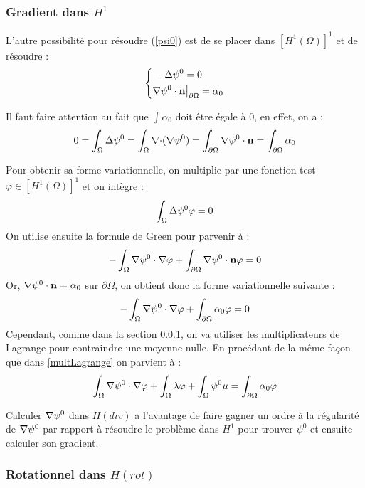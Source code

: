 \subsubsection{Gradient dans $H^1$}
\label{secpsi0hdiv}

L'autre possibilité pour résoudre (\ref{psi0}) est de se placer dans $[H^1(\Omega)]^1$ et de résoudre :
\begin{equation}
\label{pbpsi0}
\left\{
\begin{aligned}
&-{\Delta}\psi^0 = 0\\
&{\nabla}\psi^0\cdot \mathbf{n}{\big\rvert_{\partial\Omega}}=\alpha_0
\end{aligned}
\right.
\end{equation}

Il faut faire attention au fait que $\int \alpha_0$ doit être égale à 0, en effet, on a :
\[
0=\int_\Omega {\Delta} \psi^0 = \int_\Omega {\nabla\cdot}({\nabla}\psi^0) = \int_{\partial\Omega} {\nabla}\psi^0\cdot \mathbf{n} = \int_{\partial\Omega} \alpha_0
\]

Pour obtenir sa forme variationnelle, on multiplie par une fonction test $\varphi\in [H^1(\Omega)]^1$ et on intègre :
\[
\int_\Omega {\Delta}\psi^0 \varphi = 0
\]
On utilise ensuite la formule de Green pour parvenir à :
\[
-\int_\Omega {\nabla}\psi^0\cdot{\nabla}\varphi + \int_{\partial\Omega} {\nabla}\psi^0\cdot \mathbf{n}\varphi = 0
\]
Or, ${\nabla}\psi^0\cdot \mathbf{n} = \alpha_0$ sur $\partial\Omega$, on obtient donc la forme variationnelle suivante :
\[
-\int_\Omega {\nabla}\psi^0\cdot{\nabla}\varphi + \int_{\partial\Omega} \alpha_0\varphi = 0
\]
Cependant, comme dans la section \ref{secpsi0hdiv}, on va utiliser les multiplicateurs de Lagrange pour contraindre une moyenne nulle. En procédant de la même façon que dans \ref{multLagrange} on parvient à :
\begin{equation}
\label{fvpsi0}
\int_\Omega {\nabla}\psi^0\cdot{\nabla}\varphi + \int_\Omega \lambda\varphi + \int_\Omega \psi^0\mu = \int_{\partial\Omega} \alpha_0\varphi
\end{equation}

Calculer ${\nabla}\psi^0$ dans $H(div)$ a l'avantage de faire gagner un ordre à la régularité de ${\nabla}\psi^0$ par rapport à résoudre le problème dans $H^1$ pour trouver $\psi^0$ et ensuite calculer son gradient.\\

\subsubsection{Rotationnel dans $H(rot)$}

